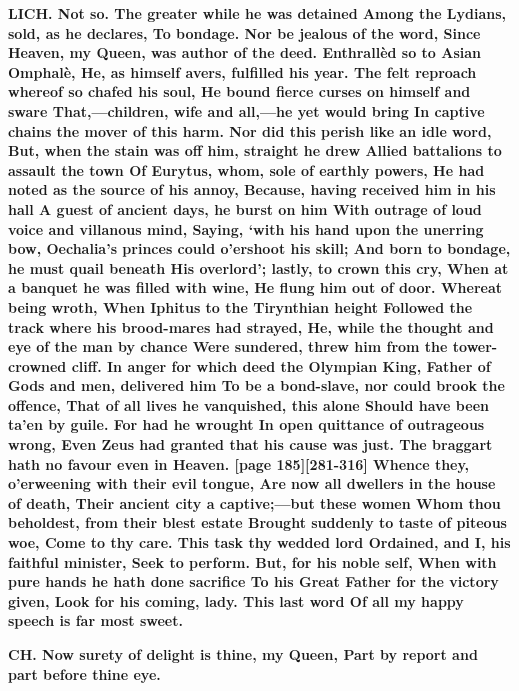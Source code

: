 \documentclass[11pt,letter]{book}
\begin{document}
\par \textbf{LICH. Not so. The greater while he was detained Among the Lydians, sold, as he declares, To bondage. Nor be jealous of the word, Since Heaven, my Queen, was author of the deed. Enthrallèd so to Asian Omphalè, He, as himself avers, fulfilled his year. The felt reproach whereof so chafed his soul, He bound fierce curses on himself and sware That,—children, wife and all,—he yet would bring In captive chains the mover of this harm. Nor did this perish like an idle word, But, when the stain was off him, straight he drew Allied battalions to assault the town Of Eurytus, whom, sole of earthly powers, He had noted as the source of his annoy, Because, having received him in his hall A guest of ancient days, he burst on him With outrage of loud voice and villanous mind, Saying, ‘with his hand upon the unerring bow, Oechalia’s princes could o’ershoot his skill; And born to bondage, he must quail beneath His overlord’; lastly, to crown this cry, When at a banquet he was filled with wine, He flung him out of door. Whereat being wroth, When Iphitus to the Tirynthian height Followed the track where his brood-mares had strayed, He, while the thought and eye of the man by chance Were sundered, threw him from the tower-crowned cliff. In anger for which deed the Olympian King, Father of Gods and men, delivered him To be a bond-slave, nor could brook the offence, That of all lives he vanquished, this alone Should have been ta’en by guile. For had he wrought In open quittance of outrageous wrong, Even Zeus had granted that his cause was just. The braggart hath no favour even in Heaven. [page 185][281-316] Whence they, o’erweening with their evil tongue, Are now all dwellers in the house of death, Their ancient city a captive;—but these women Whom thou beholdest, from their blest estate Brought suddenly to taste of piteous woe, Come to thy care. This task thy wedded lord Ordained, and I, his faithful minister, Seek to perform. But, for his noble self, When with pure hands he hath done sacrifice To his Great Father for the victory given, Look for his coming, lady. This last word Of all my happy speech is far most sweet.}
\par 

\par \textbf{CH. Now surety of delight is thine, my Queen, Part by report and part before thine eye.}
\par 
\end{document}
